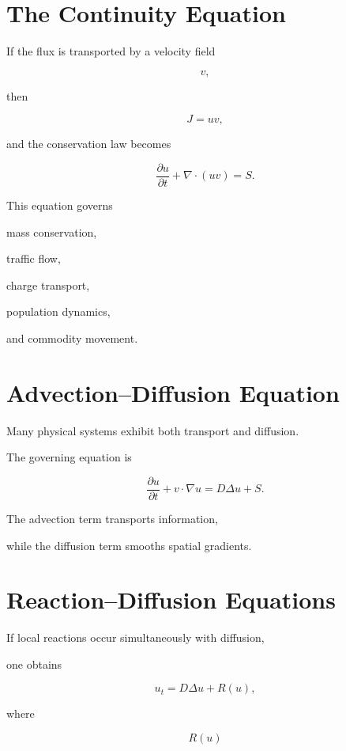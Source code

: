 \documentclass[11pt,fleqn]{book}
\numberwithin{equation}{chapter}
\theoremstyle{plain}
\theoremstyle{definition}
\theoremstyle{remark}
\begin{document}

\section{The Continuity Equation}

If the flux is transported by a velocity field

\[
v,
\]

then

\[
J
=
uv,
\]

and the conservation law becomes

\[
\boxed{
\frac{\partial u}{\partial t}
+
\nabla\cdot(uv)
=
S.
}
\]

This equation governs

mass conservation,

traffic flow,

charge transport,

population dynamics,

and commodity movement.


\section{Advection--Diffusion Equation}

Many physical systems exhibit both transport and diffusion.

The governing equation is

\[
\boxed{
\frac{\partial u}{\partial t}
+
v\cdot\nabla u
=
D\Delta u
+
S.
}
\]

The advection term transports information,

while the diffusion term smooths spatial gradients.


\section{Reaction--Diffusion Equations}

If local reactions occur simultaneously with diffusion,

one obtains

\[
\boxed{
u_t
=
D\Delta u
+
R(u),
}
\]

where

\[
R(u)
\]
\end{document}
